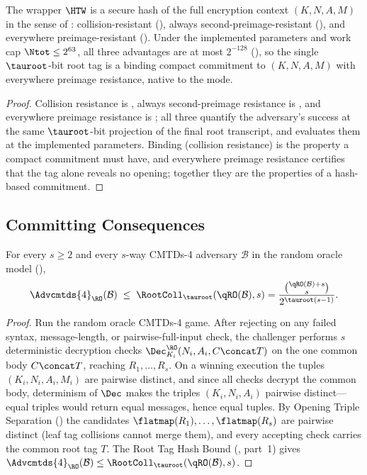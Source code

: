 \begin{corollary}
\label{cor:tag-commitment}
The wrapper $\HTW$ is a secure hash of the full encryption context
$(K, N, A, M)$ in the sense of \cite{RS04}: collision-resistant
(), always second-preimage-resistant (), and
everywhere preimage-resistant (). Under the implemented
parameters and work cap $\Ntot \leq 2^{63}$, all three advantages are at most
$2^{-128}$ (), so the single $\tauroot$-bit
root tag is a binding compact commitment to $(K, N, A, M)$ with everywhere
preimage resistance, native to the mode.
\end{corollary}

\begin{proof}
Collision resistance is , always second-preimage
resistance is , and everywhere preimage resistance is
; all three quantify
the adversary's success at the same $\tauroot$-bit projection of the final
root transcript, and  evaluates them at the
implemented parameters. Binding (collision resistance) is the property a
compact commitment must have, and everywhere preimage resistance certifies
that the tag alone reveals no opening; together they are the properties of
a hash-based commitment.
\end{proof}

\subsection{Committing Consequences}

\begin{theorem}
\label{thm:cmtds4-ro}
For every $s \geq 2$ and every $s$-way CMTDs-4
adversary $\mathcal{B}$ in the \TW{} random oracle model
(),
\[
  \Advcmtds{4}_\RO(\mathcal{B})
  \;\leq\; \RootColl_{\tauroot}(\qRO(\mathcal{B}), s)
  = \frac{\binom{\qRO(\mathcal{B}) + s}{s}}{2^{\tauroot (s - 1)}}.
\]
\end{theorem}

\begin{proof}
Run the random oracle CMTDs-4 game. After rejecting on any failed syntax,
message-length, or pairwise-full-input check, the challenger performs $s$
deterministic decryption checks $\Dec_{K_i}^\RO(N_i,A_i,C \concat T)$ on
the one common body $C \concat T$, reaching $R_1,\dots,R_s$. On a winning
execution the tuples $(K_i,N_i,A_i,M_i)$ are pairwise distinct, and since
all checks decrypt the common body, determinism of $\Dec$ makes the
triples $(K_i,N_i,A_i)$ pairwise distinct---equal triples would return
equal messages, hence equal tuples. By Opening Triple Separation
() the candidates $\flatmap(R_1),\dots,\flatmap(R_s)$
are pairwise distinct (leaf tag collisions cannot merge them), and every
accepting check carries the common root tag $T$. The Root Tag Hash Bound
(, part~1) gives
$\Advcmtds{4}_\RO(\mathcal{B}) \leq \RootColl_{\tauroot}(\qRO(\mathcal{B}), s)$.
\end{proof}

